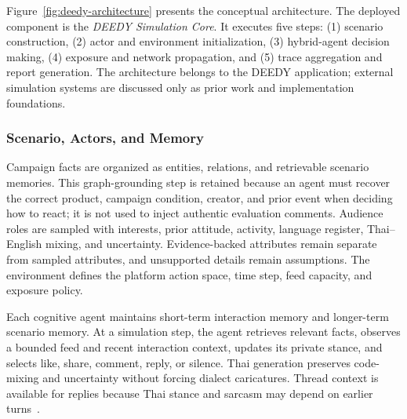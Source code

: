 \documentclass[conference]{IEEEtran}
\begin{document}
Figure~\ref{fig:deedy-architecture} presents the conceptual architecture. The
deployed component is the \emph{DEEDY Simulation Core}. It executes five
steps: (1) scenario construction, (2) actor and environment initialization,
(3) hybrid-agent decision making, (4) exposure and network propagation, and
(5) trace aggregation and report generation. The architecture belongs to the
DEEDY application; external simulation systems are discussed only as prior
work and implementation foundations.

\subsubsection{Scenario, Actors, and Memory}

Campaign facts are organized as entities, relations, and retrievable scenario
memories. This graph-grounding step is retained because an agent must recover
the correct product, campaign condition, creator, and prior event when deciding
how to react; it is not used to inject authentic evaluation comments. Audience
roles are sampled with interests, prior attitude, activity, language register,
Thai--English mixing, and uncertainty. Evidence-backed attributes remain
separate from sampled attributes, and unsupported details remain assumptions.
The environment defines the platform action space, time step, feed capacity,
and exposure policy.

Each cognitive agent maintains short-term interaction memory and longer-term
scenario memory. At a simulation step, the agent retrieves relevant facts,
observes a bounded feed and recent interaction context, updates its private
stance, and selects like, share, comment, reply, or silence. Thai generation
preserves code-mixing and uncertainty without forcing dialect caricatures.
Thread context is available for replies because Thai stance and sarcasm may
depend on earlier turns~\cite{hazarika2018cascade}.
\end{document}
